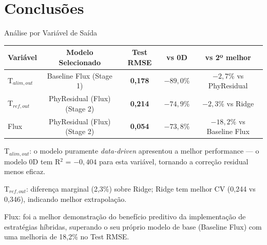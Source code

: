 \section{Conclusões}

\begin{slide}{Análise por Variável de Saída}
  \centering
  \scriptsize
  \begin{tabular}{lcccc}
    \toprule
    \textbf{Variável} & \textbf{Modelo Selecionado} & \textbf{Test RMSE} & \textbf{vs 0D} & \textbf{vs 2º melhor} \\
    \midrule
    \textcolor{blue!70!black}{T$_{alim,out}$} & Baseline Flux (Stage 1) & \textbf{0,178} & $-89,0\%$ & $-2,7\%$ vs PhyResidual \\
    \textcolor{orange!70!black}{T$_{ref,out}$} & PhyResidual (Flux) (Stage 2) & \textbf{0,214} & $-74,9\%$ & $-2,3\%$ vs Ridge \\
    \textcolor{green!70!black}{Flux} & PhyResidual (Flux) (Stage 2) & \textbf{0,054} & $-73,8\%$ & $-18,2\%$ vs Baseline Flux \\
    \bottomrule
  \end{tabular}
  \vfill
  \begin{Item}[0.10]
    \item \textcolor{blue!70!black}{T$_{alim,out}$}: o modelo puramente \textit{data-driven} apresentou a melhor performance — o modelo 0D tem R$^2$ = $-0{,}404$ para esta variável, tornando a correção residual menos eficaz.
    \item \textcolor{orange!70!black}{T$_{ref,out}$}: diferença marginal (2,3\%) sobre Ridge; Ridge tem melhor CV (0,244 vs 0,346), indicando melhor extrapolação.
    \item \textcolor{green!70!black}{Flux}: foi a melhor demonstração do benefício preditivo da implementação de estratégias híbridas, superando o seu próprio modelo de base (Baseline Flux) com uma melhoria de 18,2\% no Test RMSE.
  \end{Item}
\end{slide}

